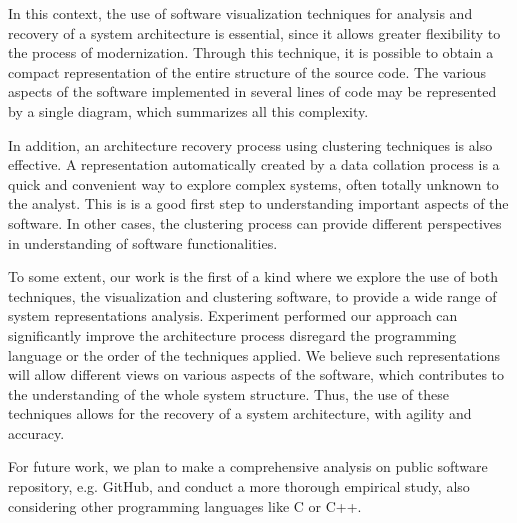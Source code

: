 \documentclass{sig-alternate-05-2015}
\begin{document}
In this context, the use of software visualization techniques for analysis and recovery of a system architecture is essential, since it allows greater flexibility to the process of modernization. Through this technique, it is possible to obtain a compact representation of the entire structure of the source code. The various aspects of the software implemented in several lines of code may be represented by a single diagram, which summarizes all this complexity.

In addition, an architecture recovery process using clustering techniques is also effective. A representation automatically created by a data collation process is a quick and convenient way to explore complex systems, often totally unknown to the analyst. This is is a good first step to understanding important aspects of the software. In other cases, the clustering process can provide different perspectives in understanding of software functionalities.

To some extent, our work is the first of a kind where we explore the use of both techniques, the visualization and clustering software, to provide a wide range of system representations analysis. Experiment performed our approach can significantly improve the architecture process disregard the programming language or the order of the techniques applied. We believe such representations will allow different views on various aspects of the software, which contributes to the understanding of the whole system structure. Thus, the use of these techniques allows for the recovery of a system architecture, with agility and accuracy. 

For future work, we plan to make a comprehensive analysis on public software repository, e.g. GitHub, and conduct a more thorough empirical study, also considering other programming languages like C or C++.




\end{document}
